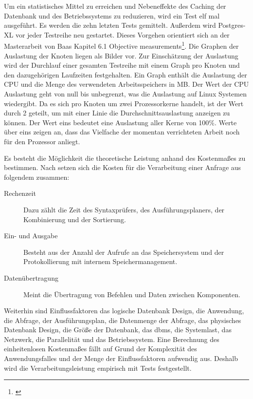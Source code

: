 Um ein statistisches Mittel zu erreichen und Nebeneffekte des Caching der Datenbank und des Betriebssystems zu reduzieren, wird ein Test elf mal ausgeführt.
Es werden die zehn letzten Tests gemittelt.
Außerdem wird Postgres-XL vor jeder Testreihe neu gestartet.
Dieses Vorgehen orientiert sich an der Masterarbeit von Baas Kapitel 6.1 Objective measurements\footnote{\cite[S.51]{ma:neo4j}}.
Die Graphen der Auslastung der Knoten liegen als Bilder vor.
Zur Einschätzung der Auslastung wird der Durchlauf einer gesamten Testreihe mit einem Graph pro Knoten und den dazugehörigen Laufzeiten festgehalten.
Ein Graph enthält die Auslastung der CPU und die Menge des verwendeten Arbeitsspeichers in MB.
Der Wert der CPU Auslastung geht von null bis unbegrenzt, was die Auslastung auf Linux Systemen wiedergibt.
Da es sich pro Knoten um zwei Prozessorkerne handelt, ist der Wert durch 2 geteilt, um mit einer Linie die Durchschnittsauslastung anzeigen zu können.
Der Wert eins bedeutet eine Auslastung aller Kerne von 100\%{}.
Werte über eins zeigen an, dass das Vielfache der momentan verrichteten Arbeit noch für den Prozessor anliegt.

Es besteht die Möglichkeit die theoretische Leistung anhand des Kostenmaßes zu bestimmen.
Nach \cite[S.300 f.]{book:kudrass} setzen sich die Kosten für die Verarbeitung einer Anfrage aus folgendem zusammen:
\begin{description}
\item[Rechenzeit] Dazu zählt die Zeit des Syntaxprüfers, des Ausführungsplaners, der Kombinierung und der Sortierung.
\item[Ein- und Ausgabe] Besteht aus der Anzahl der Aufrufe an das Speichersystem und der Protokollierung mit internem Speichermanagement.
\item[Datenübertragung] Meint die Übertragung von Befehlen und Daten zwischen Komponenten.
\end{description}
Weiterhin sind Einflussfaktoren das  logische Datenbank Design, die Anwendung, die Abfrage, der Ausführungsplan, die Datenmenge der Abfrage, das physisches Datenbank Design, die Größe der Datenbank, das \Gls{dbms}, die Systemlast, das Netzwerk, die  Parallelität und das Betriebssystem.
Eine Berechnung des einheitenlosen Kostenmaßes fällt auf Grund der Komplexität des Anwendungsfalles und der Menge der Einflussfaktoren aufwendig aus.
Deshalb wird die Verarbeitungsleistung empirisch mit Tests festgestellt.

